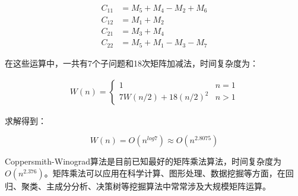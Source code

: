 \begin{align*}
	C_{11} & = M_5 + M_4 - M_2 + M_6 \\
	C_{12} & = M_1 + M_2             \\
	C_{21} & = M_3 + M_4             \\
	C_{22} & = M_5 + M_1 - M_3 - M_7
\end{align*}

在这些运算中，一共有7个子问题和18次矩阵加减法，时间复杂度为：

\vspace{-1cm}

\begin{align*}
	W(n) = \begin{cases}
		1                   & n = 1 \\
		7W(n/2) + 18(n/2)^2 & n > 1
	\end{cases}
\end{align*}

求解得到：

\vspace{-0.5cm}

$$
	W(n) = O(n^{log7}) \approx O(n^{2.8075})
$$

Coppersmith-Winograd算法是目前已知最好的矩阵乘法算法，时间复杂度为$ O(n^{2.376}) $。矩阵乘法可以应用在科学计算、图形处理、数据挖掘等方面，在回归、聚类、主成分分析、决策树等挖掘算法中常常涉及大规模矩阵运算。

\newpage